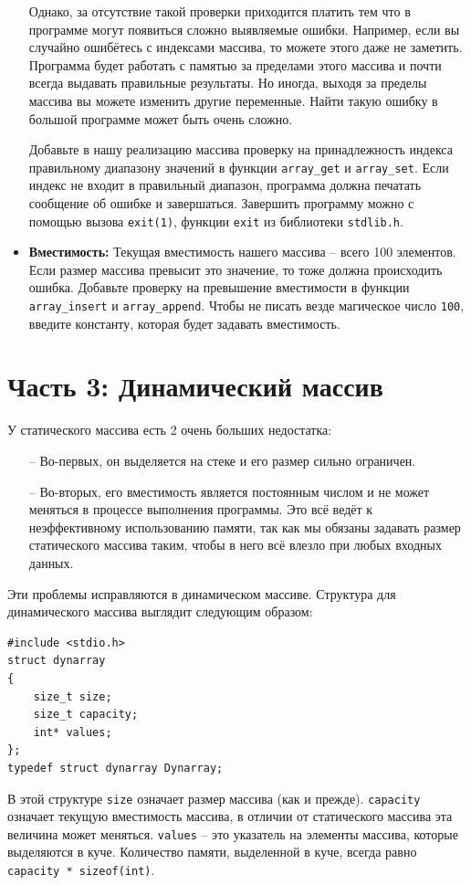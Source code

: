 \documentclass{article}
\begin{document}
\begin{itemize}
Однако, за отсутствие такой проверки приходится платить тем что в программе могут появиться сложно выявляемые ошибки. Например, если вы случайно ошибётесь с индексами массива, то можете этого даже не заметить. Программа будет работать с памятью за пределами этого массива и почти всегда выдавать правильные результаты. Но иногда, выходя за пределы массива вы можете изменить другие переменные. Найти такую ошибку в большой программе может быть очень сложно.

Добавьте в нашу реализацию массива проверку на принадлежность индекса правильному диапазону значений в функции \texttt{array\_get} и \texttt{array\_set}. Если индекс не входит в правильный диапазон, программа должна печатать сообщение об ошибке и завершаться. Завершить программу можно с помощью вызова \texttt{exit(1)}, функции \texttt{exit} из библиотеки \texttt{stdlib.h}. 

\item \textbf{Вместимость:} Текущая вместимость нашего массива -- всего 100 элементов. Если размер массива превысит это значение, то тоже должна происходить ошибка. Добавьте проверку на превышение вместимости в функции \texttt{array\_insert} и \texttt{array\_append}. Чтобы не писать везде магическое число \texttt{100}, введите константу, которая будет задавать вместимость.

\end{itemize}

\newpage
\section*{Часть 3: Динамический массив}
У статического массива есть 2 очень больших недостатка:
\begin{itemize}
\item[--] Во-первых, он выделяется на стеке и его размер сильно ограничен.
\item[--] Во-вторых, его вместимость является постоянным числом и не может меняться в процессе выполнения программы. Это всё ведёт к неэффективному использованию памяти, так как мы обязаны задавать размер статического массива таким, чтобы в него всё влезло при любых входных данных.
\end{itemize}

Эти проблемы исправляются в динамическом массиве. Структура для динамического массива выглядит следующим образом:
\begin{lstlisting}
#include <stdio.h>
struct dynarray 
{
    size_t size;
    size_t capacity;
    int* values;
};
typedef struct dynarray Dynarray;
\end{lstlisting}
В этой структуре \texttt{size} означает размер массива (как и прежде). \texttt{capacity} означает текущую вместимость массива, в отличии от статического массива эта величина может меняться. \texttt{values} -- это указатель на элементы массива, которые выделяются в куче. Количество памяти, выделенной в куче, всегда равно \texttt{capacity * sizeof(int)}.\\
\end{document}
